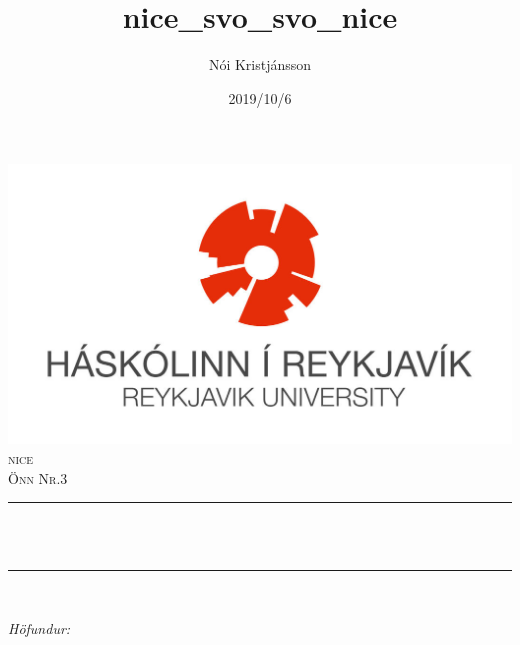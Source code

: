 \documentclass[12pt]{article}
\title{nice_svo_svo_nice}
\author{Nói Kristjánsson}
\date{2019/10/6}
\makeatletter
\let\thetitle\@title
\let\theauthor\@author
\let\thedate\@date
\makeatother
\begin{document}

    \begin{titlepage}
        \centering
        \vspace*{0.5 cm}
        \includegraphics[scale = 1.15]{HR_logo_midjad_hires.jpg}\\[1.0 cm]	%
        \textsc{\Large nice}\\[0.5 cm]				%
        \textsc{\large Önn Nr.3}\\[0.5 cm]				%
        \rule{\linewidth}{0.2 mm} \\[0.4 cm]
        { \huge \bfseries \thetitle}\\
        \rule{\linewidth}{0.2 mm} \\[1.5 cm]
        
        \begin{minipage}{0.4\textwidth}
            \begin{flushleft} \large
                \emph{Höfundur:}\\
                \theauthor
                \end{flushleft}
                \end{minipage}~
                \begin{minipage}{0.4\textwidth}
                \begin{flushright} \large
            \end{flushright}
        \end{minipage}\\[2 cm]
        
        {\large \thedate}\\[2 cm]
    
        \vfill
        
    \end{titlepage}


    
\end{document}
